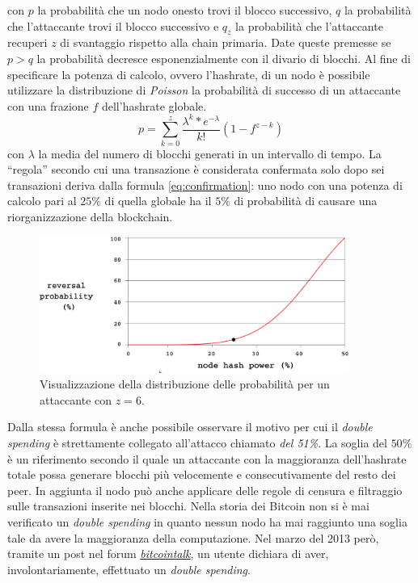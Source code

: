 con $p$ la probabilità che un nodo onesto trovi il blocco successivo, $q$ la probabilità che l'attaccante trovi il blocco successivo e $q_{z}$ la probabilità che l'attaccante recuperi $z$ di svantaggio rispetto alla chain primaria. Date queste premesse se $p>q$ la probabilità decresce esponenzialmente con il divario di blocchi. Al fine di specificare la potenza di calcolo, ovvero l'hashrate, di un nodo è possibile utilizzare la distribuzione di \textit{Poisson} la probabilità di successo di un attaccante con una frazione $f$ dell'hashrate globale.
\begin{equation}\label{eq:confirmation}
    p=\sum_{k=0}^{z} \frac{\lambda^{k}*e^{-\lambda}}{k!}(1-f^{z-k})
\end{equation}
con $\lambda$ la media del numero di blocchi generati in un intervallo di tempo. La ``regola'' secondo cui una transazione è considerata confermata solo dopo sei transazioni deriva dalla formula \ref{eq:confirmation}: uno nodo con una potenza di calcolo pari al $25\%$ di quella globale ha il $5\%$ di probabilità di causare una riorganizzazione della blockchain.
\begin{figure}[H]
    \centering
    \includegraphics[width=0.9\textwidth]{images/hashrate_curve.png}
    \caption{Visualizzazione della distribuzione delle probabilità per un attaccante con $z=6$.}
\end{figure}
Dalla stessa formula è anche possibile osservare il motivo per cui il \textit{double spending} è strettamente collegato all'attacco chiamato \textit{del 51\%}. La soglia del $50\%$ è un riferimento secondo il quale un attaccante con la maggioranza dell'hashrate totale possa generare blocchi più velocemente e consecutivamente del resto dei peer. In aggiunta il nodo può anche applicare delle regole di censura e filtraggio sulle transazioni inserite nei blocchi.\newline
Nella storia dei Bitcoin non si è mai verificato un \textit{double spending} in quanto nessun nodo ha mai raggiunto una soglia tale da avere la maggioranza della computazione. Nel marzo del 2013 però, tramite un post nel forum \href{https://bitcointalk.org/index.php?topic=152348.0}{\textit{bitcointalk}}, un utente dichiara di aver, involontariamente, effettuato un \textit{double spending}.
